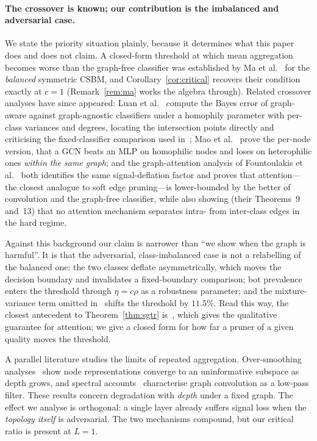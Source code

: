 \documentclass[onecolumn,pdflatex,sn-basic,Numbered]{sn-jnl}
\theoremstyle{thmstyleone}
\theoremstyle{thmstylethree}
\begin{document}
\paragraph{The crossover is known; our contribution is the imbalanced and
adversarial case.} We state the priority situation plainly, because it determines
what this paper does and does not claim. A closed-form threshold at which mean
aggregation becomes worse than the graph-free classifier was established by Ma
et al.~\citep[Thm.~2]{ma2022homophily} for the \emph{balanced} symmetric CSBM, and
Corollary~\ref{cor:critical} recovers their condition exactly at $c = 1$
(Remark~\ref{rem:ma} works the algebra through). Related crossover analyses have
since appeared: Luan et al.~\citep{luan2023when} compute the Bayes error of
graph-aware against graph-agnostic classifiers under a homophily parameter with
per-class variances and degrees, locating the intersection points directly and
criticising the fixed-classifier comparison used in~\citep{ma2022homophily}; Mao
et al.~\citep{mao2023demystifying} prove the per-node version, that a GCN beats an
MLP on homophilic nodes and loses on heterophilic ones \emph{within the same graph};
and the graph-attention analysis of Fountoulakis
et al.~\citep{fountoulakis2023graph} both identifies the same signal-deflation
factor and proves that attention---the closest analogue to soft edge
pruning---is lower-bounded by the better of convolution and the graph-free
classifier, while also showing (their Theorems~9 and~13) that no attention
mechanism separates intra- from inter-class edges in the hard regime.

Against this background our claim is narrower than ``we show when the graph is
harmful''. It is that the adversarial, class-imbalanced case is not a relabelling of
the balanced one: the two classes deflate asymmetrically, which moves the decision
boundary and invalidates a fixed-boundary comparison; bot prevalence enters the
threshold through $\eta = c\rho$ as a robustness parameter; and the mixture-variance
term omitted in~\citep{ma2022homophily} shifts the threshold by $11.5\%$. Read this way,
the closest antecedent to Theorem~\ref{thm:sgtr} is~\citep{fountoulakis2023graph},
which gives the qualitative guarantee for attention; we give a closed form for how
far a pruner of a given quality moves the threshold.

A parallel literature studies the limits of repeated aggregation. Over-smoothing
analyses~\citep{li2018deeper,oono2020graph} show node representations converge to
an uninformative subspace as depth grows, and spectral
accounts~\citep{nt2019revisiting} characterise graph convolution as a low-pass
filter. These results concern degradation with \emph{depth} under a fixed graph.
The effect we analyse is orthogonal: a single layer already suffers signal loss
when the \emph{topology itself} is adversarial. The two mechanisms compound, but
our critical ratio is present at $L = 1$.
\end{document}
